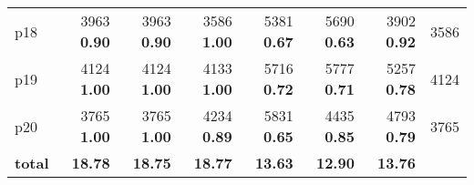 \begin{tabular}{lrrrrrrr}
\multicolumn{1}{l|}{p18} & {\footnotesize 3963} \textbf{0.90} & {\footnotesize 3963} \textbf{0.90} & {\footnotesize 3586} \textbf{1.00} & {\footnotesize 5381} \textbf{0.67} & {\footnotesize 5690} \textbf{0.63} & {\footnotesize 3902} \textbf{0.92} & \multicolumn{1}{|r}{3586}\\
\multicolumn{1}{l|}{p19} & {\footnotesize 4124} \textbf{1.00} & {\footnotesize 4124} \textbf{1.00} & {\footnotesize 4133} \textbf{1.00} & {\footnotesize 5716} \textbf{0.72} & {\footnotesize 5777} \textbf{0.71} & {\footnotesize 5257} \textbf{0.78} & \multicolumn{1}{|r}{4124}\\
\multicolumn{1}{l|}{p20} & {\footnotesize 3765} \textbf{1.00} & {\footnotesize 3765} \textbf{1.00} & {\footnotesize 4234} \textbf{0.89} & {\footnotesize 5831} \textbf{0.65} & {\footnotesize 4435} \textbf{0.85} & {\footnotesize 4793} \textbf{0.79} & \multicolumn{1}{|r}{3765}\\
\midrule
\textbf{total} & \textbf{18.78} & \textbf{18.75} & \textbf{18.77} & \textbf{13.63} & \textbf{12.90} & \textbf{13.76} & \\
\bottomrule
\end{tabular}

